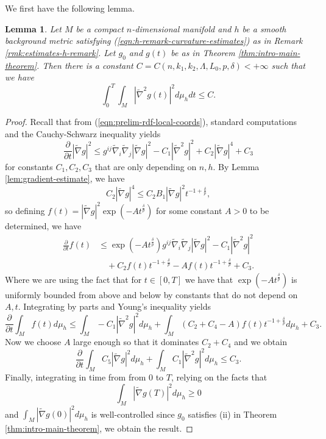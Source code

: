 \documentclass[12pt]{amsart}
\theoremstyle{plain}
\theoremstyle{plain}
\newtheorem{lemma}[subsection]{Lemma}
\theoremstyle{definition}
\theoremstyle{remark}
\numberwithin{equation}{subsection}
\newcommand{\hdel}{\tilde{\nabla}}
\begin{document}
We first have the following lemma.

\begin{lemma}\label{lem:hessiansquared-spacetime-integrability}
    Let $M$ be a compact $n$-dimensional manifold and $h$ be a smooth background metric satisfying (\ref{eqn:h-remark-curvature-estimates}) as in Remark \ref{rmk:estimates-h-remark}. Let $g_0$ and $g(t)$ be as in Theorem \ref{thm:intro-main-theorem}. Then there is a constant $C = C(n, k_1, k_2, \Lambda, L_0, p, \delta) < +\infty$ such that we have
    \begin{equation*}
        \int_0^T \int_M |\hdel^2 g(t)|^2 d\mu_h dt \leq C.
    \end{equation*}
\end{lemma}

\begin{proof}
    Recall that from (\ref{eqn:prelim-rdf-local-coords}), standard computations and the Cauchy-Schwarz inequality yields
    \begin{equation*}
        \frac{\partial}{\partial t} |\hdel g|^2 \leq g^{ij}\hdel_i\hdel_j |\hdel g|^2 - C_1 |\hdel^2 g|^2 + C_2|\hdel g|^4 + C_3
    \end{equation*}
    for constants $C_1, C_2, C_3$ that are only depending on $n, h$. By Lemma \ref{lem:gradient-estimate}, we have
    \begin{equation*}
        C_2|\hdel g|^4 \leq C_2B_1|\hdel g|^2t^{-1+\frac{\delta}{p}},
    \end{equation*}
    so defining $f(t) = |\hdel g|^2\exp\left(-At^\frac{\delta}{p}\right)$ for some constant $A > 0$ to be determined, we have
    \begin{align*}
        \frac{\partial}{\partial t} f(t) &\leq \exp\left(-At^\frac{\delta}{p}\right)g^{ij}\hdel_i\hdel_j|\hdel g|^2 - C_1|\hdel^2 g|^2 \nonumber \\
        &\quad + C_2f(t)t^{-1+\frac{\delta}{p}} - Af(t)t^{-1+\frac{\delta}{p}} + C_3.
    \end{align*}
    Where we are using the fact that for $t \in [0, T]$ we have that $\exp\left(-At^\frac{\delta}{p}\right)$ is uniformly bounded from above and below by constants that do not depend on $A, t$. Integrating by parts and Young's inequality yields
    \begin{equation*}
        \frac{\partial}{\partial t} \int_M f(t)d\mu_h \leq \int_M -C_1|\hdel^2g|^2d\mu_h + \int_M\left(C_2+C_4-A\right)f(t)t^{-1+\frac{\delta}{p}}d\mu_h + C_3.
    \end{equation*}
    Now we choose $A$ large enough so that it dominates $C_2 + C_4$ and we obtain
    \begin{equation*}
        \frac{\partial}{\partial t} \int_M C_5|\hdel g|^2d\mu_h + \int_M C_1|\hdel^2 g|^2d\mu_h \leq C_3.
    \end{equation*}
    Finally, integrating in time from from $0$ to $T$, relying on the facts that 
    \begin{equation*}
        \int_M |\hdel g(T)|^2 d\mu_h \geq 0
    \end{equation*}
    and $\int_M |\hdel g(0)|^2 d\mu_h$ is well-controlled since $g_0$ satisfies (ii) in Theorem \ref{thm:intro-main-theorem}, we obtain the result.
\end{proof}
\end{document}
